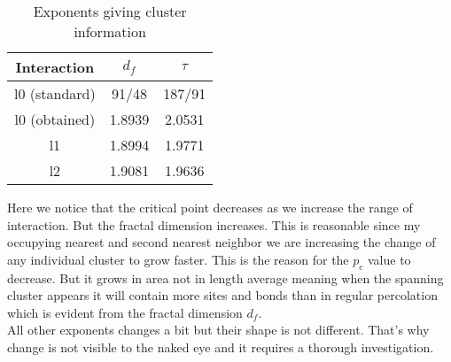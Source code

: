 \begin{table}
	\centering
	\begin{tabular}{|c|c|c|}
		\hline
		Interaction 	& $d_f$   & $\tau$   \\ \hline
		l0 (standard) 	& 91/48   & 187/91   \\ \hline
		l0 (obtained)	& 1.8939  & 2.0531 \\ \hline
		l1				& 1.8994  & 1.9771     \\ \hline
		l2				& 1.9081  & 1.9636   \\ \hline
	\end{tabular}
	\caption{Exponents giving cluster information}
	\label{tab:cluster-info}
\end{table}
		
Here we notice that the critical point decreases as we increase the range of interaction. But the fractal dimension increases. This is reasonable since my occupying nearest and second nearest neighbor we are increasing the change of any individual cluster to grow faster. This is the reason for the $p_c$ value to decrease. But it grows in area not in length average meaning when the spanning cluster appears it will contain more sites and bonds than in regular percolation which is evident from the fractal dimension $d_f$. \\
All other exponents changes a bit but their shape is not different. That's why change is not visible to the naked eye and it requires a thorough investigation.